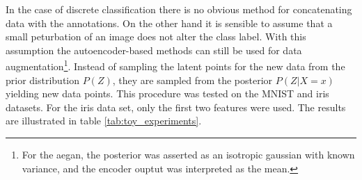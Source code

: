 In the case of discrete classification there is no obvious method for concatenating data with the annotations. On the other hand it is sensible to assume that a small peturbation of an image does not alter the class label. With this assumption the autoencoder-based methods can still be used for data augmentation\footnote{For the \acrshort{aegan}, the posterior was asserted as an isotropic gaussian with known variance, and the encoder ouptut was interpreted as the mean.}. Instead of sampling the latent points for the new data from the prior distribution $P(Z)$, they are sampled from the posterior $P(Z|X=x)$ yielding new data points. This procedure was tested on the MNIST and iris datasets. For the iris data set, only the first two features were used. The results are illustrated in table \ref{tab:toy_experiments}. %











